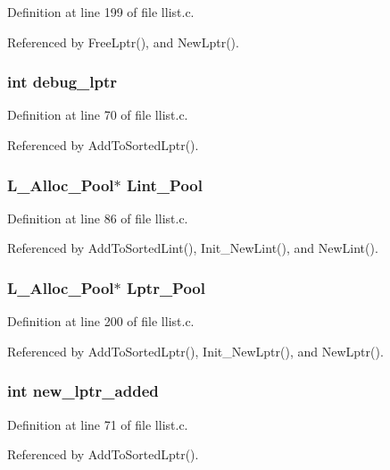 Definition at line 199 of file llist.c.

Referenced by Free\-Lptr(), and New\-Lptr().
\subsubsection{\setlength{\rightskip}{0pt plus 5cm}int \bf{debug\_\-lptr}}\label{llist_8c_a2320eeffae21baf35c127cb437b2cf1}




Definition at line 70 of file llist.c.

Referenced by Add\-To\-Sorted\-Lptr().
\subsubsection{\setlength{\rightskip}{0pt plus 5cm}\bf{L\_\-Alloc\_\-Pool}$\ast$ \bf{Lint\_\-Pool}}\label{llist_8c_a69ce49ef3e32e3f7895718cccdc5f89}




Definition at line 86 of file llist.c.

Referenced by Add\-To\-Sorted\-Lint(), Init\_\-New\-Lint(), and New\-Lint().
\subsubsection{\setlength{\rightskip}{0pt plus 5cm}\bf{L\_\-Alloc\_\-Pool}$\ast$ \bf{Lptr\_\-Pool}}\label{llist_8c_26be995ce0eae58cb7aaab3327f45124}




Definition at line 200 of file llist.c.

Referenced by Add\-To\-Sorted\-Lptr(), Init\_\-New\-Lptr(), and New\-Lptr().
\subsubsection{\setlength{\rightskip}{0pt plus 5cm}int \bf{new\_\-lptr\_\-added}}\label{llist_8c_182c93597d3659b182b53e3ae2d41a60}




Definition at line 71 of file llist.c.

Referenced by Add\-To\-Sorted\-Lptr().